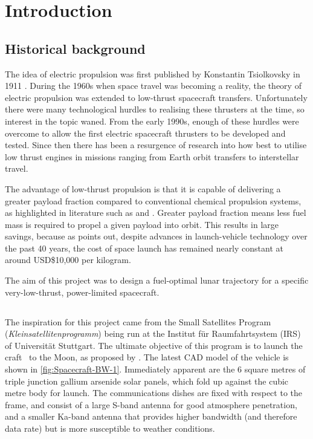 \chapter{Introduction} \label{cha:Introduction}
 

\section{Historical background} \label{sec:Historical-background}

The idea of electric propulsion was first published by Konstantin Tsiolkovsky in 1911 \parencite{Choueiri2004}. During the 1960s when space travel was becoming a reality, the theory of electric propulsion was extended to low-thrust spacecraft transfers. Unfortunately there were many technological hurdles to realising these thrusters at the time, so interest in the topic waned. From the early 1990s, enough of these hurdles were overcome to allow the first electric spacecraft thrusters to be developed and tested. Since then there has been a resurgence of research into how best to utilise low thrust engines in missions ranging from Earth orbit transfers to interstellar travel.
 
The advantage of low-thrust propulsion is that it is capable of delivering a greater payload fraction compared to conventional chemical propulsion systems, as highlighted in literature such as \textcite{Kluever1995} and \textcite{Yang2007}. Greater payload fraction means less fuel mass is required to propel a given payload into orbit. This results in large savings, because as \textcite{Manzella2008} points out, despite advances in launch-vehicle technology over the past 40 years, the cost of space launch has remained nearly constant at around USD\$10,000 per kilogram.
 
The aim of this project was to design a fuel-optimal lunar trajectory for a specific very-low-thrust, power-limited spacecraft.

\section{\BW} \label{sec:Spacecraft}

The inspiration for this project came from the Small Satellites Program (\emph{Kleinsatellitenprogramm}) being run at the Institut f\"{u}r Raumfahrtsystem (IRS) of Universit\"{a}t Stuttgart. The ultimate objective of this program is to launch the craft \BW\ to the Moon, as proposed by \textcite{Roeser2006}. The latest CAD model of the vehicle is shown in \autoref{fig:Spacecraft-BW-1}. Immediately apparent are the 6 square metres of triple junction gallium arsenide solar panels, which fold up against the cubic metre body for launch. The communications dishes are fixed with respect to the frame, and consist of a large S-band antenna for good atmosphere penetration, and a smaller Ka-band antenna that provides higher bandwidth (and therefore data rate) but is more susceptible to weather conditions.

